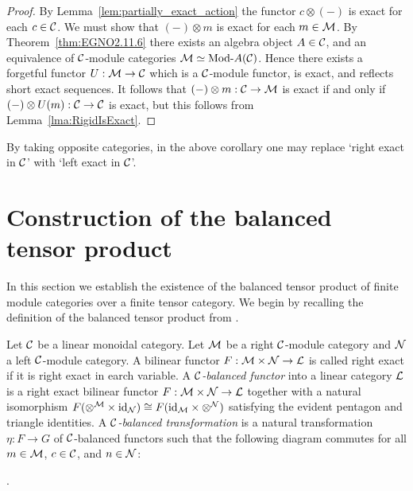 \documentclass{amsart}
\begin{document}
\begin{proof}
	By Lemma~\ref{lem:partially_exact_action} the functor $c \otimes (-)$ is exact for each $c \in \mathcal C$. We must show that $(-) \otimes m$ is exact for each $m \in \mathcal M$. By Theorem~\ref{thm:EGNO2.11.6} there exists an algebra object $A \in \mathcal C$, and an equivalence of $\mathcal C$-module categories $\cM \simeq \Mod{}{A}(\cC)$. Hence there exists a forgetful functor $U:\mathcal M \to \mathcal C$ which is a $\mathcal C$-module functor, is exact, and reflects short exact sequences. It follows that $(-) \otimes m: \mathcal C \to \mathcal M$ is exact if and only if $(-) \otimes U(m): \mathcal C \to \mathcal C$ is exact, but this follows from Lemma~\ref{lma:RigidIsExact}. 
\end{proof}

\begin{remark}
	By taking opposite categories, in the above corollary one may replace `right exact in $\mathcal C$' with `left exact in $\mathcal C$'. 
\end{remark}


\section{Construction of the balanced tensor product} \label{sec:tc-deligne}

In this section we establish the existence of the balanced tensor product of finite module categories over a finite tensor category.  We begin by recalling the definition of the balanced tensor product from \cite{0909.3140}.


\begin{definition}
	Let $\mathcal C$ be a linear monoidal category. 
	Let $\mathcal M$ be a right $\mathcal C$-module category and $\mathcal N$ a left $\mathcal C$-module category.  A bilinear functor $F: \mathcal M \times \mathcal N \to \mathcal L$ is called right exact if it is right exact in earch variable.   A {\em $\mathcal C$-balanced functor} into a linear category $\mathcal L$ is a right exact bilinear functor $F: \mathcal M \times \mathcal N \to \mathcal L$ together with a natural isomorphism $F(\otimes^{\mathcal M} \times \mathrm{id}_{\mathcal N}) \cong F(\mathrm{id}_{\mathcal M} \times \otimes^{\mathcal N})$ satisfying the evident pentagon and triangle identities.   
	A {\em $\mathcal C$-balanced transformation} is a natural transformation $\eta:F \to G$ of $\mathcal C$-balanced functors such that the following diagram commutes for all $m \in \mathcal M$, $c \in \mathcal C$, and $n \in \mathcal N$:
\begin{center}
.
\end{center}
\end{definition}
\end{document}
